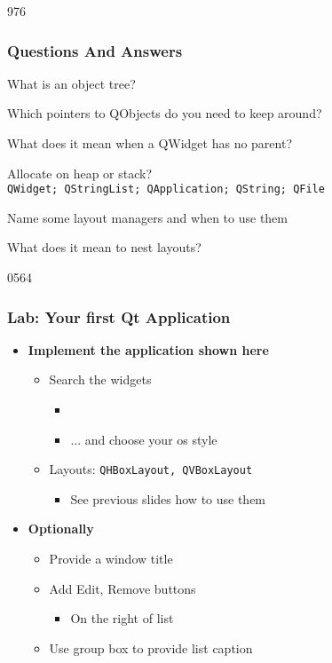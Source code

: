 \begin{slide}[fragile]{976}
  \frametitle{Questions And Answers}\label{parentChildQuestions}
  \begin{questionize}
  \item What is an object tree?
  \item Which pointers to QObjects do you need to keep around?
  \item What does it mean when a QWidget has no parent?
  \item Allocate on heap or stack? \\ \texttt{QWidget; QStringList;
      QApplication; QString; QFile}
  \item Name some layout managers and when to use them
  \item What does it mean to nest layouts?
 \end{questionize}
\end{slide}

\begin{slide}{0564}\frametitle{Lab: Your first Qt Application}
  \label{first_app}
  \begin{itemize}
  \item \textbf{Implement the application shown here}
    \begin{itemize}
   \item Search the widgets
      \begin{itemize}    
      \item {}
      \item ... and choose your os style
      \end{itemize}
    \item Layouts: \texttt{QHBoxLayout, QVBoxLayout}
      \begin{itemize}
      \item See previous slides how to use them
      \end{itemize}
    \end{itemize}
  \item \textbf{Optionally}
    \begin{itemize} 
    \item Provide a window title
    \item Add Edit, Remove buttons
      \begin{itemize}
      \item  On the right of list
      \end{itemize}
    \item Use group box to provide list caption
    \end{itemize}
 \end{itemize}
  \medskip
   \newline
\end{slide}

